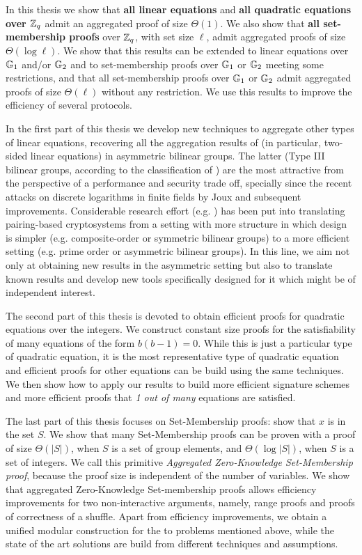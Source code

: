 In this thesis we show that \textbf{all linear equations} and \textbf{all quadratic equations over $\mathbb{Z}_q$} admit an aggregated proof of size $\Theta(1)$. We also show that \textbf{all set-membership proofs} over $\mathbb{Z}_q$, with set size $\ell$, admit aggregated proofs of size $\Theta(\log \ell)$. We show that this results can be extended to linear equations over $\mathbb{G}_1$ and/or $\mathbb{G}_2$ and to set-membership proofs over $\mathbb{G}_1$ or $\mathbb{G}_2$ meeting some restrictions, and that all set-membership proofs over $\mathbb{G}_1$ or $\mathbb{G}_2$ admit aggregated proofs of size $\Theta(\ell)$ without any restriction. We use this results to improve the efficiency of several protocols. 

In the first part of this thesis we develop new techniques to aggregate
other types of linear equations, recovering all the aggregation results of \cite{C:JutRoy14} (in particular, two-sided linear equations) in asymmetric bilinear groups. The latter (Type III bilinear groups, according to the classification of \cite{DAM:GalPatSma08}) are the most 
attractive 
from the perspective of a performance and security trade off, specially since the recent attacks on discrete logarithms in finite fields by Joux \cite{SAC:Joux13} and subsequent improvements. Considerable research effort 
(e.g. \cite{C:AGOT14a,EC:Freeman10})
has been put into translating pairing-based cryptosystems from a setting with more structure in which design is simpler (e.g. composite-order or symmetric bilinear groups) to a more efficient setting (e.g. prime order or asymmetric bilinear groups). In this line, we aim not only at obtaining new results in the asymmetric setting but also to translate known results and develop new tools specifically designed for it which might be of independent interest.

The second part of this thesis is devoted to obtain efficient proofs for quadratic equations over the integers. We construct constant size proofs for the satisfiability of many equations of the form $b(b-1)=0$. While this is just a particular type of quadratic equation, it is the most representative type of quadratic equation and efficient proofs for other equations can be build using the same techniques. We then show how to apply our results to build more efficient signature schemes and more efficient proofs that \emph{1 out of many} equations are satisfied.

The last part of this thesis focuses on Set-Membership proofs: show that $x$ is in the set $S$. We show that many Set-Membership proofs can be proven with a proof of size $\Theta(|S|)$, when $S$ is a set of group elements, and $\Theta(\log |S|)$, when $S$ is a set of integers. We call this primitive \emph{Aggregated Zero-Knowledge Set-Membership proof}, because the proof size is independent of the number of variables. We show that aggregated Zero-Knowledge Set-membership proofs allows efficiency improvements for two non-interactive arguments, namely, range proofs and proofs of correctness of a shuffle. Apart from efficiency improvements, we obtain a unified modular construction for the to problems mentioned above, while the state of the art solutions are build from different techniques and assumptions.
